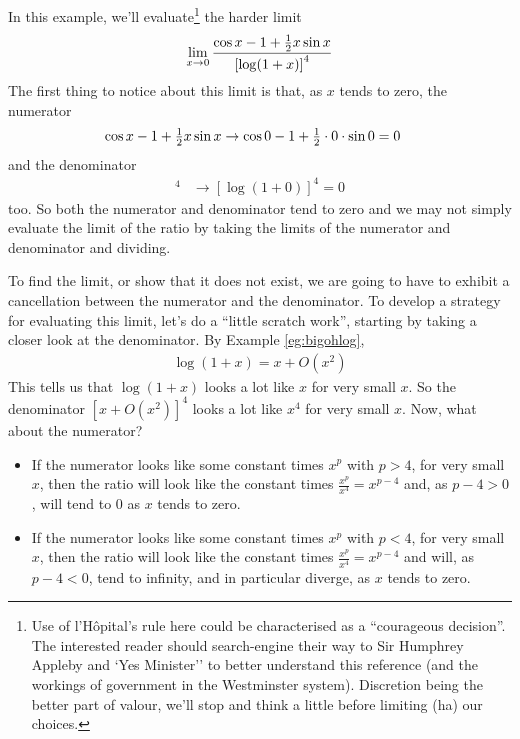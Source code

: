\begin{eg}\label{bigohlimitB}
In this example, we'll evaluate\footnote{Use of l'H\^opital's rule here could be characterised as a ``courageous
decision''. The interested reader should search-engine their way to Sir Humphrey Appleby and `Yes Minister'' to better
understand this reference (and the workings of government in the Westminster system). Discretion being the better
part of valour, we'll stop and think a little before limiting (ha) our choices.} the harder limit
\begin{equation*}
\lim_{x\rightarrow 0}\frac{\cos x -1 + \tfrac{1}{2} x\sin x}{{[\log(1+x)]}^4}
\end{equation*}
The first thing to notice about this limit is that, as $x$ tends to zero,
the numerator
\begin{align*}
\cos x -1 + \tfrac{1}{2} x\sin x &\to \cos 0 -1 +\tfrac{1}{2}\cdot 0\cdot\sin 0=0
\end{align*}
and the denominator
\begin{align*}
  [\log(1+x)]^4 & \to [\log(1+0)]^4=0
\end{align*}
too. So both the numerator and denominator tend to zero and we may not simply evaluate  the limit of the ratio by taking
the limits of the numerator and denominator and dividing.

To find the limit, or show that it does not exist, we are going to have to exhibit a cancellation between the numerator
and the denominator. To develop a strategy for evaluating this limit, let's do a ``little scratch work'', starting by
taking a closer look at the denominator. By Example \ref{eg:bigohlog},
\begin{align*}
\log(1+x) = x+O(x^2)
\end{align*}
This tells us that $\log(1+x)$ looks a lot like $x$ for very small $x$.
So the denominator $[x+O(x^2)]^4$ looks a lot like $x^4$ for very small $x$.
Now, what about the numerator?
\begin{itemize} \itemsep1pt \parskip0pt  \itemindent-15pt
\item If the numerator looks like some constant times $x^p$ with $p>4$,
for very small $x$, then the ratio will look like the constant times
$\frac{x^p}{x^4}=x^{p-4}$ and, as $p-4>0$, will tend to $0$ as $x$
tends to zero.

\item If the numerator looks like some constant times $x^p$ with $p<4$,
for very small $x$, then the ratio will look like the constant times
$\frac{x^p}{x^4}=x^{p-4}$ and will, as $p-4<0$, tend to infinity,
and in particular diverge, as $x$ tends to zero.


\end{itemize}
\end{eg}
